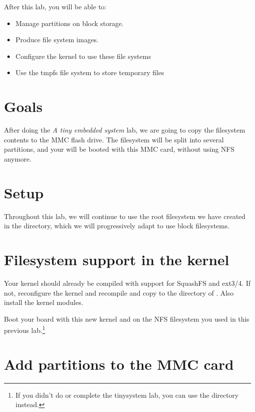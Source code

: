 
After this lab, you will be able to:
\begin{itemize}
\item Manage partitions on block storage.
\item Produce file system images.
\item Configure the kernel to use these file systems
\item Use the tmpfs file system to store temporary files
\end{itemize}

\section{Goals}

After doing the {\em A tiny embedded system} lab, we are going to copy
the filesystem contents to the MMC flash drive. The filesystem will be
split into several partitions, and your \devboard will be booted with
this MMC card, without using NFS anymore.

\section{Setup}

Throughout this lab, we will continue to use the root filesystem we
have created in the  directory, which we will progressively adapt to use block filesystems.

\section{Filesystem support in the kernel}

Your kernel should already be compiled with support for SquashFS and ext3/4.
If not, reconfigure the kernel and recompile and copy to the 
directory of . Also install the kernel modules.

Boot your board with this new kernel and on the NFS filesystem you
used in this previous lab.\footnote{If you didn't do or complete the
  tinysystem lab, you can use the  directory instead.}

\section{Add partitions to the MMC card}

